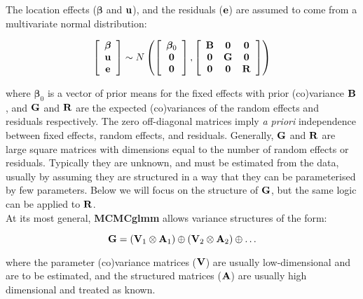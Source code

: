 \documentclass{article}
\begin{document}
The location effects (${\bm \beta}$ and ${\bf u}$), and the residuals (${\bf e}$) are assumed to come from a multivariate normal distribution:

\begin{equation}
\left[
\begin{array}{c}
{\bm \beta}\\
{\bf u}\\
{\bf e}
\end{array}
\right]
 \sim N\left(
\left[
\begin{array}{c}
{\bm \beta}_{0}\\
{\bf 0}\\
{\bf 0}\\
\end{array}
\right]
, 
\left[
\begin{array}{ccc}
{\bf B}&{\bf 0}&{\bf 0}\\
{\bf 0}&{\bf G}&{\bf 0}\\
{\bf 0}&{\bf 0}&{\bf R}\\
\end{array}
\right]
\right)
\label{V-Eq}
\end{equation}

where ${\bm \beta}_{0}$ is a vector of prior means for the fixed effects with prior (co)variance ${\bf B}$, and ${\bf G}$ and ${\bf R}$ are the expected (co)variances of the random effects and residuals respectively.  The zero off-diagonal matrices imply \emph{a priori} independence between fixed effects, random effects, and residuals.  Generally, ${\bf G}$ and ${\bf R}$ are large square matrices with dimensions equal to the number of random effects or residuals. Typically they are unknown, and must be estimated from the data, usually by assuming they are structured in a way that they can be parameterised by few parameters. Below we will focus on the structure of ${\bf G}$, but the same logic can be applied to ${\bf R}$.\\ 

At its most general, {\bf MCMCglmm} allows variance structures of the form:

\begin{equation}
{\bf G}= \left({\bf V}_{1}\otimes{\bf A}_{1}\right) \oplus \left({\bf V}_{2}\otimes{\bf A}_{2}\right) \oplus \ldots
\label{G3-Eq}
\end{equation}

where the parameter (co)variance matrices (${\bf V}$) are usually low-dimensional and are to be estimated, and the structured matrices (${\bf A}$) are usually high dimensional and treated as known.
\end{document}

